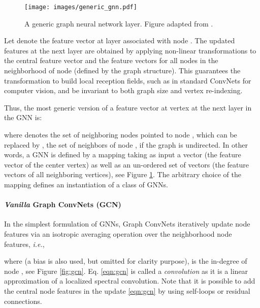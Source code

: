 \documentclass{article}
\begin{document}
\begin{figure}[h]
    \centering
    \texttt{[image: images/generic\_gnn.pdf]}
    \caption{A generic graph neural network layer. Figure adapted from \cite{bresson2017residual}.}
    \label{fig:generic-gnn}
\end{figure}

Let  denote the feature vector at layer  associated with node .
The updated features  at the next layer  are obtained by applying non-linear transformations to the central feature vector  and the feature vectors  for all nodes  in the neighborhood of node  (defined by the graph structure). 
This guarantees the transformation to build local reception fields, such as in standard ConvNets for computer vision, and be invariant to both graph size and vertex re-indexing.









Thus, the most generic version of a feature vector  at vertex  at the next layer in the GNN is:

where  denotes the set of neighboring nodes  pointed to node , which can be replaced by , the set of neighbors of node , if the graph is undirected. In other words, a GNN is defined by a mapping  taking as input a vector  (the feature vector of the center vertex) as well as an un-ordered set of vectors  (the feature vectors of all neighboring vertices), see Figure \ref{fig:generic-gnn}. 
The arbitrary choice of the mapping  defines an instantiation of a class of GNNs. 








\paragraph{\textit{Vanilla} Graph ConvNets (GCN) \cite{kipf2017semi}}
In the simplest formulation of GNNs, Graph ConvNets iteratively update node features via an isotropic averaging operation over the neighborhood node features, \textit{i.e.},

where  (a bias is also used, but omitted for clarity purpose),  is the in-degree of node ,
see Figure \ref{fig:gcn}.
Eq. \eqref{eqn:gcn} is called a \textit{convolution} as it is a linear approximation of a localized spectral convolution. Note that it is possible to add the central node features  in the update \eqref{eqn:gcn} by using self-loops or residual connections.
\end{document}
